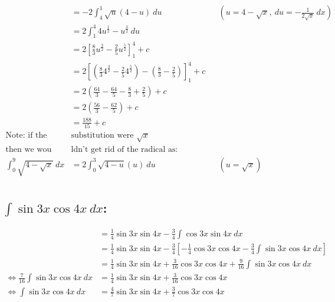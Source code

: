 \documentclass[MathsNotesBase.tex]{subfiles}
\begin{document}
  \begin{align*}
      &= -2\int_4^1{\sqrt{u}(4 - u)\ du} &&(u = 4 - \sqrt{x},\ du = -\frac{1}{2\sqrt{x}}\ dx) \\
      &= 2\int_1^4{4u^\frac{1}{2} - u^\frac{3}{2}\ du} && \\
      &= 2\left[\frac{8}{3}u^\frac{3}{2} - \frac{2}{5}u^\frac{5}{2}\right]_1^4 + c && \\[8pt]
      &= 2\left[
        \left(\frac{8}{3}4^\frac{3}{2} - \frac{2}{5}4^\frac{5}{2}\right) - 
        \left(\frac{8}{3} - \frac{2}{5}\right)
      \right]_1^4 + c && \\[8pt]
      &= 2\left(
        \frac{64}{3} - \frac{64}{5} - \frac{8}{3} + \frac{2}{5} 
      \right) + c && \\[8pt]
      &= 2\left(
        \frac{56}{3} - \frac{62}{5} 
      \right) + c && \\[8pt]
      &= \frac{188}{15} + c && \\[8pt]
      \text{Note: if the }&\text{substitution were }\sqrt{x} \\
      \text{then we wou}&\text{ldn't get rid of the radical as:} \\
      \int_0^9{\sqrt{4 - \sqrt{x}}\ dx} &= 2\int_0^3{\sqrt{4 - u}(u)\ du} &&(u = \sqrt{x}) \\
  \end{align*}
  
  
  \subsection*{$\int{\sin{3x}\cos{4x}\ dx}$:}
   
  \begin{align*}
      &= \frac{1}{4}\sin{3x}\sin{4x} - \frac{3}{4}\int{\cos{3x}\sin{4x}\ dx} \\
      &= \frac{1}{4}\sin{3x}\sin{4x} - \frac{3}{4}\left[-\frac{1}{4}\cos{3x}\cos{4x} - \frac{3}{4}\int{\sin{3x}\cos{4x}\ dx}\right] \\
      &= \frac{1}{4}\sin{3x}\sin{4x} + \frac{3}{16}\cos{3x}\cos{4x} + \frac{9}{16}\int{\sin{3x}\cos{4x}\ dx} \\
      \iff \frac{7}{16}\int{\sin{3x}\cos{4x}\ dx} &= \frac{1}{4}\sin{3x}\sin{4x} + \frac{3}{16}\cos{3x}\cos{4x} \\
      \iff \int{\sin{3x}\cos{4x}\ dx} &= \frac{4}{7}\sin{3x}\sin{4x} + \frac{3}{7}\cos{3x}\cos{4x} \\
  \end{align*}

  
\bigskip
\bigskip
\bigskip
\bigskip
\end{document}
